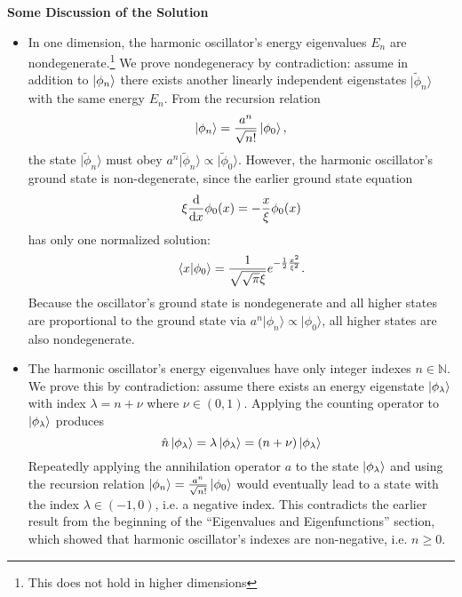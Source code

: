 \documentclass[11pt, a4paper]{article}
\renewcommand{\t}[1]{\tilde{#1}}
\newcommand{\bket}[1]{\big | {#1} \big \rangle }
\renewcommand{\k}[1]{\ket{#1}}
\newcommand{\bk}[1]{\bket{#1}}
\begin{document}
\textbf{Some Discussion of the Solution}
\begin{itemize}
	\item In one dimension, the harmonic oscillator's energy eigenvalues $ E_{n} $ are nondegenerate.\footnote{This does not hold in higher dimensions} We prove nondegeneracy by contradiction: assume in addition to $ \k{\phi_{n}} $ there exists another linearly independent eigenstates $ \bk{\t{\phi}_{n}} $ with the same energy $ E_{n} $. From the recursion relation
	\begin{equation*}
		\ket{\phi_{n}} = \frac{a^{n}}{\sqrt{n!}}\ket{\phi_{0}},
	\end{equation*}
	the state $ \bk{\t{\phi}_{n}} $ must obey $ a^{n}\bk{\t{\phi}_{n}} \propto \bk{\t{\phi}_{0}} $. However, the harmonic oscillator's ground state is non-degenerate, since the earlier ground state equation 
	\begin{equation*}
		\xi \dv{x} \phi_{0}(x) = - \frac{x}{\xi}\phi_{0}(x)
	\end{equation*}
	has only one normalized solution:
	\begin{equation*}
		\braket{x}{\phi_{0}} = \frac{1}{\sqrt{\sqrt{\pi}\xi}}e^{-\frac{1}{2}\frac{x^{2}}{\xi^{2}}}.
	\end{equation*}
	Because the oscillator's ground state is nondegenerate and all higher states are proportional to the ground state via $  a^{n}\bk{\phi_{n}} \propto \bk{\phi_{0}}  $, all higher states are also nondegenerate.
	
	\item The harmonic oscillator's energy eigenvalues have only integer indexes $ n \in \mathbb{N} $. We prove this by contradiction: assume there exists an energy eigenstate $ \k{\phi_{\lambda}} $ with index $ \lambda = n + \nu $ where $ \nu \in (0, 1) $. Applying the counting operator to $ \k{\phi_{\lambda}} $ produces
	\begin{equation*}
		\hat{n}\ket{\phi_{\lambda}} = \lambda \ket{\phi_{\lambda}} = (n + \nu)\ket{\phi_{\lambda}}
	\end{equation*}
	Repeatedly applying the annihilation operator $ a $ to the state $ \ket{\phi_{\lambda}} $ and using the recursion relation $ \ket{\phi_{n}} = \frac{a^{n}}{\sqrt{n!}}\ket{\phi_{0}} $ would eventually lead to a state with the index $ \lambda \in (-1, 0) $, i.e. a negative index. This contradicts the earlier result from the beginning of the ``Eigenvalues and Eigenfunctions'' section, which showed that harmonic oscillator's indexes are non-negative, i.e. $ n \geq 0 $. 
\end{itemize}
\end{document}

